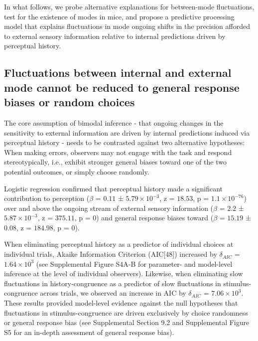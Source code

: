 \documentclass[
]{article}
\begin{document}
In what follows, we probe alternative explanations for between-mode
fluctuations, test for the existence of modes in mice, and propose a
predictive processing model that explains fluctuations in mode ongoing
shifts in the precision afforded to external sensory information
relative to internal predictions driven by perceptual history.

\hypertarget{fluctuations-between-internal-and-external-mode-cannot-be-reduced-to-general-response-biases-or-random-choices}{%
\subsection{Fluctuations between internal and external mode cannot be
reduced to general response biases or random
choices}\label{fluctuations-between-internal-and-external-mode-cannot-be-reduced-to-general-response-biases-or-random-choices}}

The core assumption of bimodal inference - that ongoing changes in the
sensitivity to external information are driven by internal predictions
induced via perceptual history - needs to be contrasted against two
alternative hypotheses: When making errors, observers may not engage
with the task and respond stereotypically, i.e., exhibit stronger
general biases toward one of the two potential outcomes, or simply
choose randomly.

Logistic regression confirmed that perceptual history made a significant
contribution to perception (\(\beta\) = \(0.11\) ±
\(\ensuremath{5.79\times 10^{-3}}\), z = \(18.53\), p =
\(\ensuremath{1.1\times 10^{-76}}\)) over and above the ongoing stream
of external sensory information (\(\beta\) = \(2.2\) ±
\(\ensuremath{5.87\times 10^{-3}}\), z = \(375.11\), p = \(0\)) and
general response biases toward (\(\beta\) = \(15.19\) ± \(0.08\), z =
\(184.98\), p = \(0\)).

When eliminating perceptual history as a predictor of individual choices
at individual trials, Akaike Information Criterion (AIC{[}48{]})
increased by \(\delta_{AIC}\) = \(\ensuremath{1.64\times 10^{3}}\) (see
Supplemental Figure S4A-B for parameter- and model-level inference at
the level of individual observers). Likewise, when eliminating slow
fluctuations in history-congruence as a predictor of slow fluctuations
in stimulus-congruence across trials, we observed an increase in AIC by
\(\delta_{AIC}\) = \(\ensuremath{7.06\times 10^{3}}\). These results
provided model-level evidence against the null hypotheses that
fluctuations in stimulus-congruence are driven exclusively by choice
randomness or general response bias (see Supplemental Section 9.2 and
Supplemental Figure S5 for an in-depth assessment of general response
bias).
\end{document}
